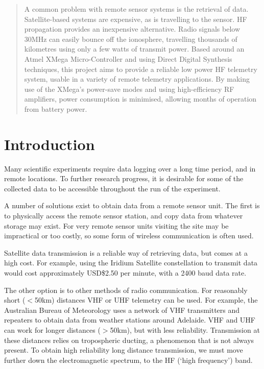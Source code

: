 \documentclass[a4paper,12pt]{article}
\begin{document}
\newpage
 \thispagestyle{empty}
 \vspace*{\fill}
\begin{abstract}
\noindent
A common problem with remote sensor systems is the retrieval of data. Satellite-based systems are expensive, as is travelling to the sensor. HF propagation provides an inexpensive alternative. Radio signals below 30MHz can easily bounce off the ionosphere, travelling thousands of kilometres using only a few watts of transmit power.
Based around an Atmel XMega Micro-Controller and using Direct Digital Synthesis techniques, this project aims to provide a reliable low power HF telemetry system, usable in a variety of remote telemetry applications. 
By making use of the XMega's power-save modes and using high-efficiency RF amplifiers, power consumption is minimised, allowing months of operation from battery power.
\end{abstract}
\vspace*{\fill}
\newpage
\tableofcontents
\newpage

\section{Introduction}
Many scientific experiments require data logging over a long time period, and in remote locations. To further research progress, it is desirable for some of the collected data to be accessible throughout the run of the experiment.

A number of solutions exist to obtain data from a remote sensor unit. The first is to physically access the remote sensor station, and copy data from whatever storage may exist. For very remote sensor units visiting the site may be impractical or too costly, so some form of wireless communication is often used. 

Satellite data transmission is a reliable way of retrieving data, but comes at a high cost. For example, using the Iridium Satellite constellation to transmit data would cost approximately USD\$2.50 per minute, with a 2400 baud data rate\citep{ref:iridium}.

The other option is to other methods of radio communication. For reasonably short ($<$50km) distances VHF or UHF telemetry can be used. For example, the Australian Bureau of Meteorology uses a network of VHF transmitters\citep{ref:bomtx} and repeaters to obtain data from weather stations around Adelaide. VHF and UHF can work for longer distances ($>$50km), but with less reliability. Transmission at these distances relies on tropospheric ducting, a phenomenon that is not always present. To obtain high reliability long distance transmission, we must move further down the electromagnetic spectrum, to the HF (`high frequency') band.
\end{document}
